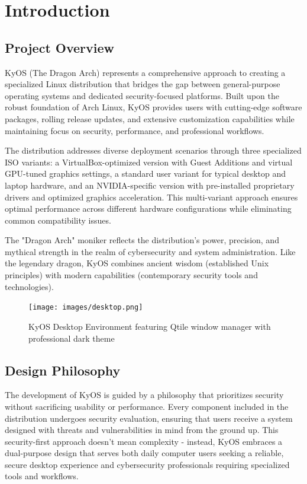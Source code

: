 \documentclass[12pt,a4paper]{article}
\begin{document}
\newpage
\tableofcontents
\newpage

\section{Introduction}

\subsection{Project Overview}
KyOS (The Dragon Arch) represents a comprehensive approach to creating a specialized Linux distribution that bridges the gap between general-purpose operating systems and dedicated security-focused platforms. Built upon the robust foundation of Arch Linux, KyOS provides users with cutting-edge software packages, rolling release updates, and extensive customization capabilities while maintaining focus on security, performance, and professional workflows.

The distribution addresses diverse deployment scenarios through three specialized ISO variants: a VirtualBox-optimized version with Guest Additions and virtual GPU-tuned graphics settings, a standard user variant for typical desktop and laptop hardware, and an NVIDIA-specific version with pre-installed proprietary drivers and optimized graphics acceleration. This multi-variant approach ensures optimal performance across different hardware configurations while eliminating common compatibility issues.

The "Dragon Arch" moniker reflects the distribution's power, precision, and mythical strength in the realm of cybersecurity and system administration. Like the legendary dragon, KyOS combines ancient wisdom (established Unix principles) with modern capabilities (contemporary security tools and technologies).

\begin{figure}[H]
\centering
\texttt{[image: images/desktop.png]}
\caption{KyOS Desktop Environment featuring Qtile window manager with professional dark theme}
\end{figure}

\subsection{Design Philosophy}
The development of KyOS is guided by a philosophy that prioritizes security without sacrificing usability or performance. Every component included in the distribution undergoes security evaluation, ensuring that users receive a system designed with threats and vulnerabilities in mind from the ground up. This security-first approach doesn't mean complexity - instead, KyOS embraces a dual-purpose design that serves both daily computer users seeking a reliable, secure desktop experience and cybersecurity professionals requiring specialized tools and workflows.
\end{document}
